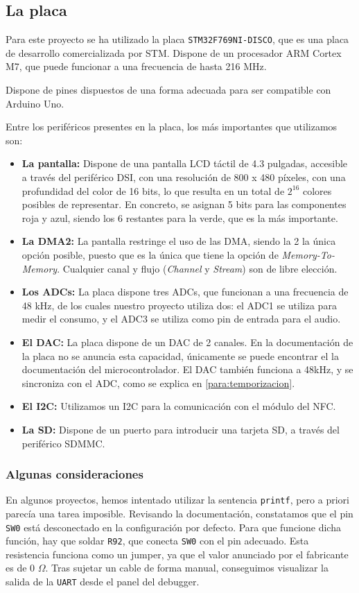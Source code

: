\subsection{La placa}
Para este proyecto se ha utilizado la placa \texttt{STM32F769NI-DISCO}, que es una placa de desarrollo comercializada por STM. Dispone de un procesador ARM Cortex M7, que puede funcionar a una frecuencia de hasta 216 MHz. 

Dispone de pines dispuestos de una forma adecuada para ser compatible con Arduino Uno.

Entre los periféricos presentes en la placa, los más importantes que utilizamos son:
\begin{itemize}
    \item \textbf{La pantalla:} Dispone de una pantalla LCD táctil de 4.3 pulgadas, accesible a través del periférico DSI, con una resolución de 800 x 480 píxeles, con una profundidad del  color de 16 bits, lo que resulta en un total de $2^{16}$ colores posibles de representar. En concreto, se asignan 5 bits para las componentes roja y azul, siendo los 6 restantes para la verde, que es la más importante.
    \item \textbf{La DMA2:} La pantalla restringe el uso de las DMA, siendo la 2 la única opción posible, puesto que es la única que tiene la opción de \textit{Memory-To-Memory}. Cualquier canal y flujo (\textit{Channel} y \textit{Stream}) son de libre elección.
    \item \textbf{Los ADCs:} La placa dispone tres ADCs, que funcionan a una frecuencia de 48 kHz, de los cuales nuestro proyecto utiliza dos: el ADC1 se utiliza para medir el consumo, y el ADC3 se utiliza como pin de entrada para el audio. 
    \item \textbf{El DAC:} La placa dispone de un DAC de 2 canales. En la documentación de la placa no se anuncia esta capacidad, únicamente se puede encontrar el la documentación del microcontrolador. El DAC también funciona a 48kHz, y se sincroniza con el ADC, como se explica en \autoref{para:temporizacion}.
    \item \textbf{El I2C:} Utilizamos un I2C para la comunicación con el módulo del NFC.
    \item \textbf{La SD:} Dispone de un puerto para introducir una tarjeta SD, a través del periférico SDMMC.
\end{itemize} 

\subsubsection{Algunas consideraciones}
En algunos proyectos, hemos intentado utilizar la sentencia \texttt{printf}, pero a priori parecía una tarea imposible. Revisando la documentación, constatamos que el pin \texttt{SW0} está desconectado en la configuración por defecto. Para que funcione dicha función, hay que soldar \texttt{R92}, que conecta \texttt{SW0} con el pin adecuado. Esta resistencia funciona como un jumper, ya que el valor anunciado por el fabricante es de 0 $\Omega$. Tras sujetar un cable de forma manual, conseguimos visualizar la salida de la \texttt{UART} desde el panel del debugger.